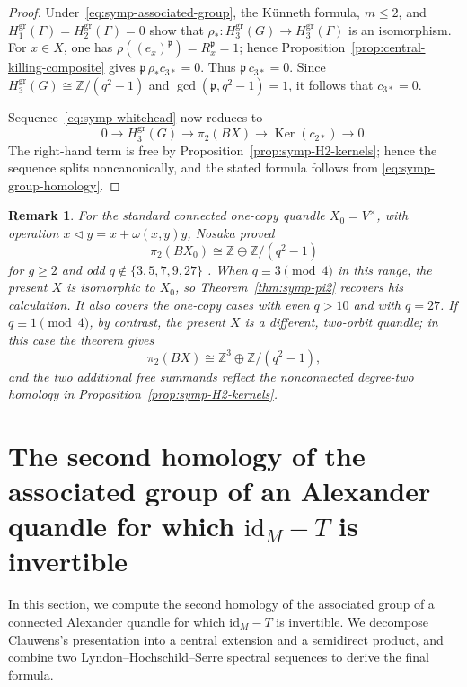 \documentclass[11pt]{article}
\newtheorem{remark}[theorem]{Remark}
\DeclareMathOperator{\Ker}{Ker}
\newcommand{\ZZ}{\mathbb Z}
\newcommand{\gr}{\mathrm{gr}}
\begin{document}
\begin{proof}
Under~\eqref{eq:symp-associated-group}, the K\"unneth formula, $m\le2$, and
$H_1^{\gr}(\Gamma)=H_2^{\gr}(\Gamma)=0$ show that
$\rho_*\colon H_3^{\gr}(G)\to H_3^{\gr}(\Gamma)$ is an isomorphism. For
$x\in X$, one has
$\rho((e_x)^{\mathfrak p})=R_x^{\mathfrak p}=1$; hence
Proposition~\ref{prop:central-killing-composite} gives
$\mathfrak p\,\rho_*c_{3*}=0$. Thus
$\mathfrak p\,c_{3*}=0$. Since
$H_3^{\gr}(G)\cong\ZZ/(q^2-1)$ and
$\gcd(\mathfrak p,q^2-1)=1$, it follows that $c_{3*}=0$.

Sequence~\eqref{eq:symp-whitehead} now reduces to
\[
 0\longrightarrow H_3^{\gr}(G)
 \longrightarrow\pi_2(BX)
 \longrightarrow\Ker(c_{2*})
 \longrightarrow0.
\]
The right-hand term is free by Proposition~\ref{prop:symp-H2-kernels}; hence
the sequence splits noncanonically, and the stated formula follows from
\eqref{eq:symp-group-homology}.
\end{proof}

\begin{remark}
\label{rem:symp-pi2-nosaka}
For the standard connected one-copy quandle
$X_0=V^\times$, with operation $x\lhd y=x+\omega(x,y)y$, Nosaka proved
\[
 \pi_2(BX_0)\cong\ZZ\oplus\ZZ/(q^2-1)
\]
for $g\ge2$ and odd $q\notin\{3,5,7,9,27\}$
\cite[Equation~(18) and Theorem~7.4(I)]{NosakaHomotopical}.
When $q\equiv3\pmod4$ in this range, the present $X$ is isomorphic to
$X_0$, so Theorem~\ref{thm:symp-pi2} recovers his calculation. It also covers
the one-copy cases with even $q>10$ and with $q=27$. If
$q\equiv1\pmod4$, by contrast, the present $X$ is a different, two-orbit
quandle; in this case the theorem gives
\[
 \pi_2(BX)\cong\ZZ^3\oplus\ZZ/(q^2-1),
\]
and the two additional free summands reflect the nonconnected degree-two
homology in Proposition~\ref{prop:symp-H2-kernels}.
\end{remark}



\section{The second homology of the associated group of an Alexander quandle for which \texorpdfstring{$\mathrm{id}_M-T$}{idM-T} is invertible}

In this section, we compute the second homology of the associated group of a
connected Alexander quandle for which $\mathrm{id}_M-T$ is invertible. We
decompose Clauwens's presentation into a central extension and a semidirect
product, and combine two Lyndon--Hochschild--Serre spectral sequences to
derive the final formula.
\end{document}
